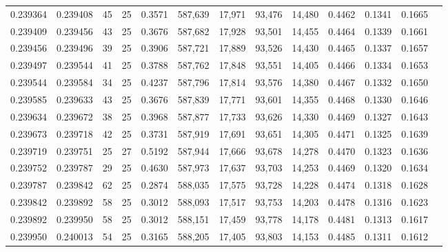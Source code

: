 \begin{tabular}{rrrrrrrrrrrrr}
0.239364 & 0.239408 &    45 &  25 &                                     0.3571 & 587,639 &  17,971 &  93,476 &  14,480 & 0.4462 & 0.1341 & 0.1665 \\
0.239409 & 0.239456 &    43 &  25 &                                     0.3676 & 587,682 &  17,928 &  93,501 &  14,455 & 0.4464 & 0.1339 & 0.1661 \\
0.239456 & 0.239496 &    39 &  25 &                                     0.3906 & 587,721 &  17,889 &  93,526 &  14,430 & 0.4465 & 0.1337 & 0.1657 \\
0.239497 & 0.239544 &    41 &  25 &                                     0.3788 & 587,762 &  17,848 &  93,551 &  14,405 & 0.4466 & 0.1334 & 0.1653 \\
0.239544 & 0.239584 &    34 &  25 &                                     0.4237 & 587,796 &  17,814 &  93,576 &  14,380 & 0.4467 & 0.1332 & 0.1650 \\
0.239585 & 0.239633 &    43 &  25 &                                     0.3676 & 587,839 &  17,771 &  93,601 &  14,355 & 0.4468 & 0.1330 & 0.1646 \\
0.239634 & 0.239672 &    38 &  25 &                                     0.3968 & 587,877 &  17,733 &  93,626 &  14,330 & 0.4469 & 0.1327 & 0.1643 \\
0.239673 & 0.239718 &    42 &  25 &                                     0.3731 & 587,919 &  17,691 &  93,651 &  14,305 & 0.4471 & 0.1325 & 0.1639 \\
0.239719 & 0.239751 &    25 &  27 &                                     0.5192 & 587,944 &  17,666 &  93,678 &  14,278 & 0.4470 & 0.1323 & 0.1636 \\
0.239752 & 0.239787 &    29 &  25 &                                     0.4630 & 587,973 &  17,637 &  93,703 &  14,253 & 0.4469 & 0.1320 & 0.1634 \\
0.239787 & 0.239842 &    62 &  25 &                                     0.2874 & 588,035 &  17,575 &  93,728 &  14,228 & 0.4474 & 0.1318 & 0.1628 \\
0.239842 & 0.239892 &    58 &  25 &                                     0.3012 & 588,093 &  17,517 &  93,753 &  14,203 & 0.4478 & 0.1316 & 0.1623 \\
0.239892 & 0.239950 &    58 &  25 &                                     0.3012 & 588,151 &  17,459 &  93,778 &  14,178 & 0.4481 & 0.1313 & 0.1617 \\
0.239950 & 0.240013 &    54 &  25 &                                     0.3165 & 588,205 &  17,405 &  93,803 &  14,153 & 0.4485 & 0.1311 & 0.1612 \\

\end{tabular}
